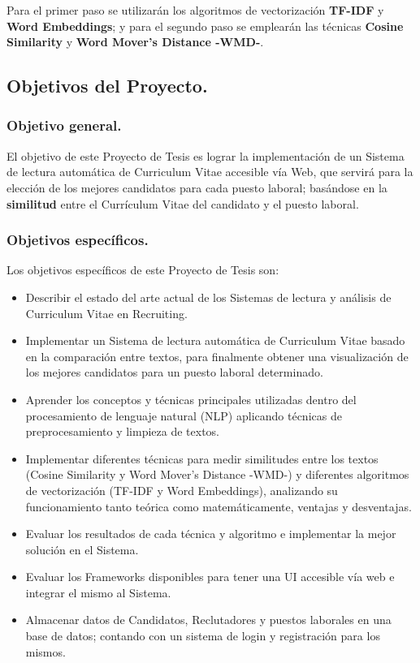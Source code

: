 \documentclass[12pt,a4paper]{article}
\begin{document}
Para el primer paso se utilizarán los algoritmos de vectorización \textbf{TF-IDF} y \textbf{Word Embeddings}; y para el segundo paso se emplearán las técnicas \textbf{Cosine Similarity} y \textbf{Word Mover's Distance -WMD-}.

\cleardoublepage    %

\subsection{Objetivos del Proyecto.}

\subsubsection{Objetivo general.}
El objetivo de este Proyecto de Tesis es lograr la implementación de un Sistema de lectura automática de Curriculum Vitae accesible vía Web, que servirá para la elección de los mejores candidatos para cada puesto laboral; basándose en la \textbf{similitud} entre el Currículum Vitae del candidato y el puesto laboral. 

\subsubsection{Objetivos específicos.}
Los objetivos específicos de este Proyecto de Tesis son:
\begin{itemize}
\item Describir el estado del arte actual de los Sistemas de lectura y análisis de Curriculum Vitae en Recruiting. 
\item Implementar un Sistema de lectura automática de Curriculum Vitae basado en la comparación entre textos, para finalmente obtener una visualización de los mejores candidatos para un puesto laboral determinado.  
\item Aprender los conceptos y técnicas principales utilizadas dentro del procesamiento de lenguaje natural (NLP) aplicando técnicas de preprocesamiento y limpieza de textos.
\item Implementar diferentes técnicas para medir similitudes entre los textos (Cosine Similarity y  Word Mover's Distance -WMD-) y diferentes algoritmos de vectorización (TF-IDF y Word Embeddings), analizando su funcionamiento tanto teórica como matemáticamente, ventajas y desventajas.
\item Evaluar los resultados de cada técnica y algoritmo e implementar la mejor solución en el Sistema.
\item Evaluar los Frameworks disponibles para tener una UI accesible vía web e integrar el mismo al Sistema.
\item Almacenar datos de Candidatos, Reclutadores y puestos laborales en una base de datos; contando con un sistema de login y registración para los mismos.
\end{itemize} 
\end{document}
